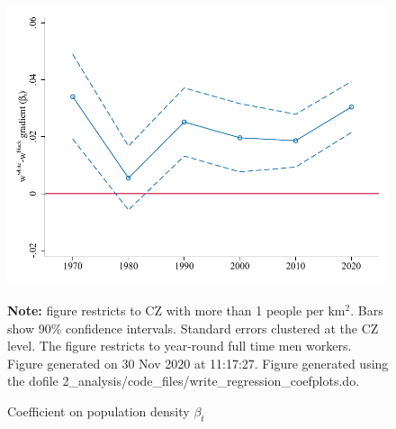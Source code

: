 \begin{figure}[!h]
\centering
\caption{Coefficient on population density $ \beta_t $}
\label{fig:race_gradient}
\includegraphics[width=.6\textwidth]{../2_analysis/output/figures/baseline_race_gradients_l_czone_density_full_time}
\par \begin{minipage}[h]{\textwidth}{\tiny\textbf{Note:} figure restricts to CZ with more than 1 people per km$^2$. Bars show 90\% confidence intervals. Standard errors clustered at the CZ level. The figure restricts to year-round full time men workers. Figure generated on 30 Nov 2020 at 11:17:27. Figure generated using the dofile 2\_analysis/code\_files/write\_regression\_coefplots.do.}\end{minipage}
\end{figure}
